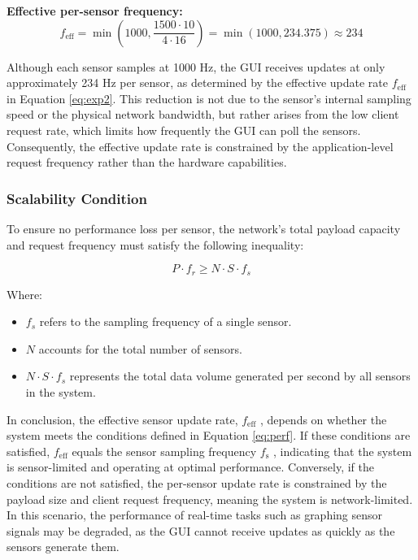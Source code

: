 \documentclass{article}
\begin{document}
\textbf{Effective per-sensor frequency:}
\begin{equation}
f_{\text{eff}} = \min \left( 1000, \frac{1500 \cdot 10}{4 \cdot 16} \right) = \min(1000, 234.375) \approx 234
\label{eq:exp2}
\end{equation}

Although each sensor samples at 1000 Hz, the GUI receives updates at only approximately 
234 Hz per sensor, as determined by the effective update rate $f_\text{eff}$ in Equation \ref{eq:exp2}. 
This reduction is not due to the sensor's internal sampling speed or the physical 
network bandwidth, but rather arises from the low client request rate, which limits 
how frequently the GUI can poll the sensors. Consequently, the effective update rate 
is constrained by the application-level request frequency rather than the hardware 
capabilities.



\subsubsection{Scalability Condition}

To ensure no performance loss per sensor, the network's total payload capacity 
and request frequency must satisfy the following inequality:

\begin{equation}
P \cdot f_r \geq N \cdot S \cdot f_s
\label{eq:perf}
\end{equation}

Where:
\begin{itemize}
    \item[] $f_s$ refers to the sampling frequency of a single sensor.
    \item[] $N$ accounts for the total number of sensors.
    \item[] $N \cdot S \cdot f_s$ represents the total data volume generated per second by all sensors in the system.
\end{itemize}


In conclusion, the effective sensor update rate, $f_\text{eff}$ , depends on whether the system 
meets the conditions defined in Equation \ref{eq:perf}. If these conditions are satisfied, 
$f_\text{eff}$  equals the sensor sampling frequency $f_\text{s}$ , indicating that the system is 
sensor-limited and operating at optimal performance. Conversely, if the conditions are 
not satisfied, the per-sensor update rate is constrained by the payload size and client 
request frequency, meaning the system is network-limited. In this scenario, the 
performance of real-time tasks such as graphing sensor signals may be degraded, as the 
GUI cannot receive updates as quickly as the sensors generate them.
\end{document}
